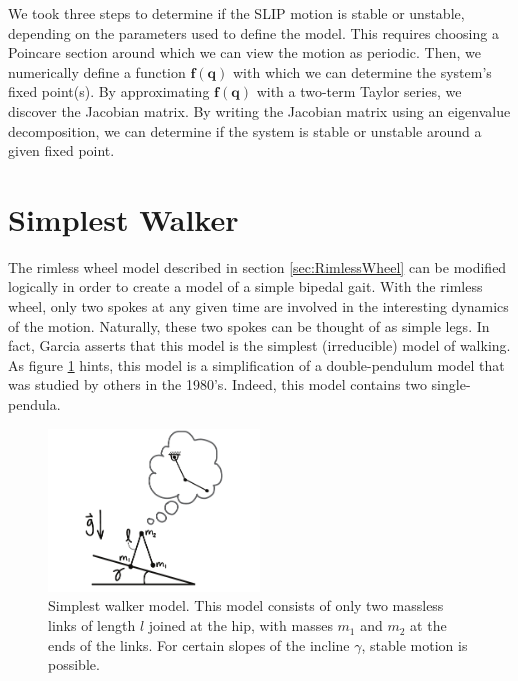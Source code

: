 
We took three steps to determine if the SLIP motion is stable or unstable,
depending on the parameters used to define the model. This requires choosing a
Poincare section around which we can view the motion as periodic. Then, we
numerically define a function $\mathbf{f}(\mathbf{q})$ with which we can
determine the system's fixed point(s). By approximating
$\mathbf{f}(\mathbf{q})$ with a two-term Taylor series, we discover the
Jacobian matrix. By writing the Jacobian matrix using an eigenvalue
decomposition, we can determine if the system is stable or unstable around a
given fixed point.

\section{Simplest Walker} %
\label{sec:SimplestWalker}



The rimless wheel model described in section \ref{sec:RimlessWheel} can be modified logically in order to create a model of a simple bipedal gait. With the rimless wheel, only two spokes at any given time are involved in the interesting dynamics of the motion. Naturally, these two spokes can be thought of as simple legs. In fact, Garcia \cite{garcia97} asserts that this model is the simplest (irreducible) model of walking. As figure \ref{fig:SimplestWalkerPendulum} hints, this model is a simplification of a double-pendulum model that was studied by 
others in the 1980's. Indeed, this model contains two single-pendula.

\begin{figure}[h]		%
\begin{centering}
\includegraphics[width=0.5\textwidth]{Figures/SimplestWalkerPendulum}\par
\end{centering}
\caption[Diagram: Simplest Walker Model]{Simplest walker model. This model consists of only two massless links of length $l$ joined at the hip, with masses $m_{1}$ and $m_{2}$ at the ends of the links. For certain slopes of the incline $\gamma$, stable motion is possible.}
\label{fig:SimplestWalkerPendulum}
\end{figure}
%

